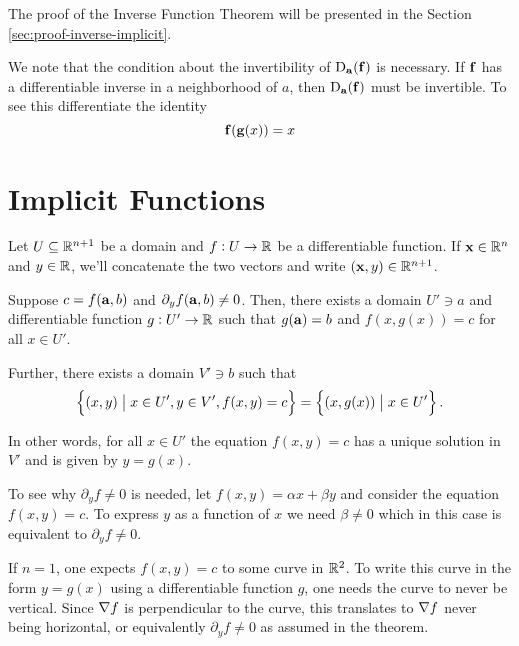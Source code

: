   The proof of  the Inverse Function Theorem will be presented in the Section \ref{sec:proof-inverse-implicit}.
  
  

 We note that the condition about the invertibility of ${\mathrm{D}}_{{\mathbf a}}(\mathbf{ f})$ is necessary.  If $\mathbf{ f}$ has a differentiable inverse in a neighborhood of $a$, then ${\mathrm{D}}_{{\mathbf a}}(\mathbf{ f})$ must be invertible. 
    To see this differentiate the identity 
    \[\mathbf{ f}(\mathbf{ g}(x))=x\]
    

  \section{Implicit Functions}

  Let $U \subseteq \mathbb{R} ^{n+1}$ be a domain and $f:U \to \mathbb{R} $ be a differentiable function.
  If $\mathbf{ x} \in \mathbb{R} ^n$ and $y \in \mathbb{R} $, we'll concatenate the two vectors and write $(\mathbf{ x}, y) \in \mathbb{R} ^{n+1}$.
  \begin{theorem}\label{thmImplicit1}
    Suppose $c = f(\mathbf{ a}, b)$ and $\partial_y f(\mathbf{ a}, b) \neq 0$.
    Then, there exists a domain $U' \ni a$ and differentiable function $g:U' \to \mathbb{R} $ such that $g(\mathbf{ a}) = b$ and $f(x, g(x)) = c$ for all $x \in U'$.
    
    Further, there exists a domain $V' \ni b$ such that 
    \[\set{ (x, y) \;\big|\; x \in U', y \in V', f(x, y) = c } = \set{ (x, g(x)) \;\big|\; x \in U'}.\]
  \end{theorem}
    
 In other words, for all $x \in U'$ the equation $f(x, y) = c$ has a unique solution in $V'$ and is given by $y = g(x)$.

  
  \begin{remark}
    To see why $\partial_y f \neq 0$ is needed, let $f(x, y) = \alpha x + \beta y$ and consider the equation $f(x, y) = c$.
    To express $y$ as a function of $x$ we need $\beta \neq 0$ which in this case is equivalent to $\partial_y f \neq 0$.
  \end{remark}

  \begin{remark}
    If $n = 1$, one expects $f(x, y) = c$ to some curve in $\mathbb{R} ^2$.
    To write this curve in the form $y = g(x)$ using a differentiable function $g$, one needs the curve to never be vertical.
    Since $\nabla f$ is perpendicular to the curve, this translates to $\nabla f$ never being horizontal, or equivalently $\partial_y f \neq 0$ as assumed in the theorem.
  \end{remark}

